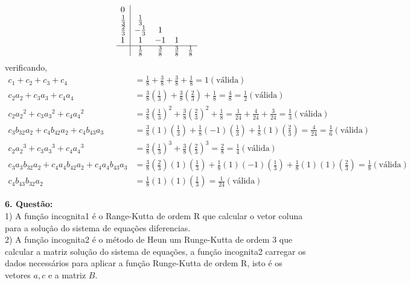 \documentclass[a4paper,12pt]{article}
\begin{document}
{\arraycolsep=3.4pt\def\arraystretch{1.4}
\[
	\begin{array}{l|cccc} 
		0 &  & & \\
		\frac{1}{3} & \frac{1}{3} & & & \\
		\frac{2}{3} & -\frac{1}{3} & 1& &\\
		1 & 1 & -1 & 1 &\\
		\hline
		&\frac{1}{8} & \frac{3}{8} & \frac{3}{8} & \frac{1}{8}
	\end{array}
\]
}
verificando,
\begin{align*}
	c_1 + c_2 + c_3 + c_4 &=  \frac{1}{8} + \frac{3}{8} + \frac{3}{8} + \frac{1}{8} = 1 (\textrm{v\'alida}) \\
	c_2 a_2 + c_3 a_3  + c_4 a_4&= \frac{3}{8}\left (\frac{1}{3}\right ) + \frac{3}{8}\left (\frac{2}{3} \right )
	 +  \frac{1}{8}= \frac{4}{8} = \frac{1}{2} (\textrm{v\'alida})\\
	 c_2 {a_2}^{2} + c_3 {a_3}^{2} + c_4 {a_4}^{2}&= \frac{3}{8}{\left (\frac{1}{3}\right )}^{2} + \frac{3}{8}{\left
		 (\frac{2}{3} \right )}^{2}
		 +  \frac{1}{8} = \frac{1}{24} + \frac{4}{24} + \frac{3}{24} = \frac{1}{3} (\textrm{v\'alida})\\
		 c_3 b_{32} a_2 + c_4 b_{42}a_2  + c_4 b_{43} a_3 &= \frac{3}{8} (1)\left ( \frac{1}{3}\right ) + \frac{1}{8}
		 (-1)\left ( \frac{1}{3}\right ) + \frac{1}{8} (1)\left ( \frac{2}{3}\right ) = \frac{4}{24}= \frac{1}{6}(\textrm{v\'alida})\\
	c_2 {a_2}^{3} + c_3 {a_3}^{3} + c_4 {a_4}^{3}&=  \frac{3}{8}{\left (\frac{1}{3}\right )}^{3} + \frac{3}{8}{\left
		 (\frac{2}{3} \right )}^{3}
		 = \frac{2}{8}= \frac{1}{4} (\textrm{v\'alida})\\
	c_3 a_3 b_{32} a_2 + c_4 a_4 b_{42}a_2  + c_4 a_4 b_{43} a_3 &= \frac{3}{8}\left (\frac{2}{3}\right ) (1)\left (\frac{1}{3}\right ) 
	+ \frac{1}{8}(1) (-1)\left (\frac{1}{3}\right ) + \frac{1}{8}(1) (1)\left (\frac{2}{3}\right ) = \frac{1}{8}(\textrm{v\'alida})\\
	c_4 b_{43} b_{32} a_2 &= \frac{1}{8} (1) (1)\left ( \frac{1}{3}\right ) = \frac{1}{24}(\textrm{v\'alida})
\end{align*}

\textbf{6. Quest\~ao:}\\

1) A fun\c c\~ao incognita1 \'e o Range-Kutta de ordem R que calcular o vetor coluna para a solu\c c\~ao do sistema de equa\c
c\~oes diferencias. \\

2)
A fun\c c\~ao incognita2 \'e o m\'etodo de Heun um Runge-Kutta de ordem 3 que calcular a matriz solu\c c\~ao do sistema
de equa\c c\~oes, a fun\c c\~ao incognita2 carregar os dados necess\'arios para aplicar a fun\c c\~ao Runge-Kutta de
ordem R, isto \'e os vetores $a,c$ e a matriz $B$. \\
\end{document}

